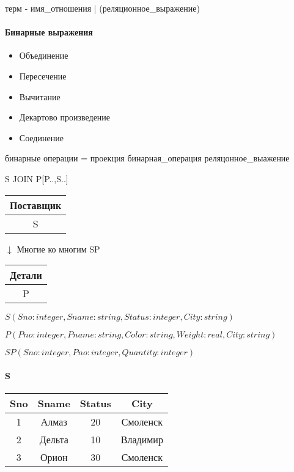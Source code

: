 \documentclass[a4paper, 14pt]{report}
\begin{document}
    терм - имя\_отношения | (реляционное\_выражение)

    \paragraph{Бинарные выражения}

    \begin{itemize}
        \item Объединение
        \item Пересечение
        \item Вычитание
        \item Декартово произведение
        \item Соединение
    \end{itemize}

    бинарные операции = проекция бинарная\_операция реляцонное\_выажение

    S JOIN P[P..,S..]

    \begin{tabular}{|c|}
        \hline
        Поставщик \\
        \hline
        S \\
        \hline
    \end{tabular}

    $ \downarrow $ Многие ко многим SP

    \begin{tabular}{|c|}
        \hline
        Детали \\
        \hline
        P \\
        \hline
    \end{tabular}

    \hfill

    $S(Sno : integer, Sname : string, Status : integer, City : string)$

    $P(Pno : integer, Pname : string, Color : string, Weight : real, City : string)$

    $SP(Sno : integer, Pno : integer, Quantity : integer)$

    \paragraph{S}

    \hfill

    \begin{tabular}{|c|c|c|c|}
        \hline
        Sno & Sname & Status & City \\
        \hline
        1 & Алмаз & 20 & Смоленск \\
        2 & Дельта & 10 & Владимир \\
        3 & Орион & 30 & Смоленск \\
        \hline
    \end{tabular}
\end{document}
